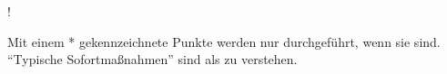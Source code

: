 {\begin{minipage}[t]{\linewidth -
{2\fboxrule} - {2\fboxsep}}
\begin{minipage}[t]{\linewidth}
{\begin{center}
  !

{\tiny Mit einem * gekennzeichnete Punkte werden nur durchgeführt, wenn
sie  sind. \enquote{Typische
Sofortmaßnahmen} sind als  zu verstehen.}
\end{center}
}
\end{minipage}
\end{minipage}\vspace{-\baselineskip}
}
\vfill
\restoregeometry\pagestyle{fancy}






    	








